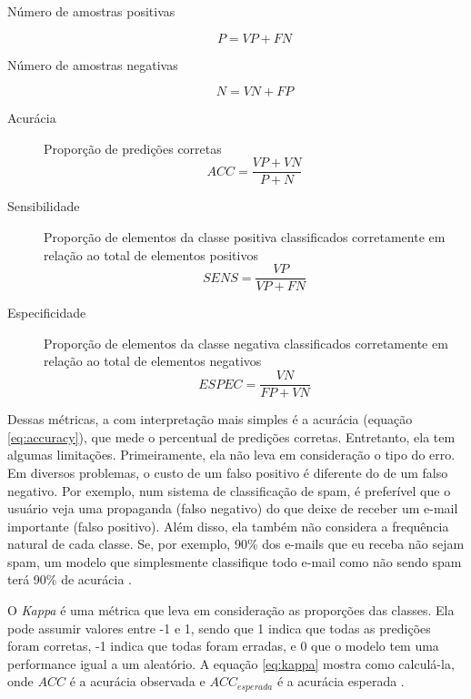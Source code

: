 \documentclass[a4paper,titlepage]{ppgi}\usepackage[]{graphicx}\usepackage[]{color}
\begin{document}
\begin{description}
\item[Número de amostras positivas]
\begin{equation}
\label{eq:positive-rate}
P = VP + FN
\end{equation}
\item[Número de amostras negativas]
\begin{equation}
\label{eq:negative-rate}
N = VN + FP
\end{equation}
\item[Acurácia] Proporção de predições corretas
\begin{equation}
\label{eq:accuracy}
ACC = \frac{VP + VN}{P + N}
\end{equation}
\item[Sensibilidade] Proporção de elementos da classe positiva classificados
corretamente em relação ao total de elementos positivos
\begin{equation}
\label{eq:sensitivity}
SENS = \frac{VP}{VP + FN}
\end{equation}
\item[Especificidade] Proporção de elementos da classe negativa classificados
corretamente em relação ao total de elementos negativos
\begin{equation}
\label{eq:specificity}
ESPEC = \frac{VN}{FP + VN}
\end{equation}
\end{description}

Dessas métricas, a com interpretação mais simples é a acurácia (equação
\ref{eq:accuracy}), que mede o percentual de predições corretas. Entretanto,
ela tem algumas limitações. Primeiramente, ela não leva em consideração o tipo
do erro. Em diversos problemas, o custo de um falso positivo é diferente do de
um falso negativo. Por exemplo, num sistema de classificação de spam, é
preferível que o usuário veja uma propaganda (falso negativo) do que deixe de
receber um e-mail importante (falso positivo). Além disso, ela também não
considera a frequência natural de cada classe. Se, por exemplo, 90\% dos
e-mails que eu receba não sejam spam, um modelo que simplesmente classifique
todo e-mail como não sendo spam terá 90\% de acurácia \cite{Kuhn2013}.

O \emph{Kappa} é uma métrica que leva em consideração as proporções das
classes. Ela pode assumir valores entre -1 e 1, sendo que 1 indica que todas as
predições foram corretas, -1 indica que todas foram erradas, e 0 que o modelo
tem uma performance igual a um aleatório. A equação \ref{eq:kappa} mostra como
calculá-la, onde $ACC$ é a acurácia observada e $ACC_{esperada}$ é a acurácia
esperada \cite{Cohen1960}.
\end{document}

